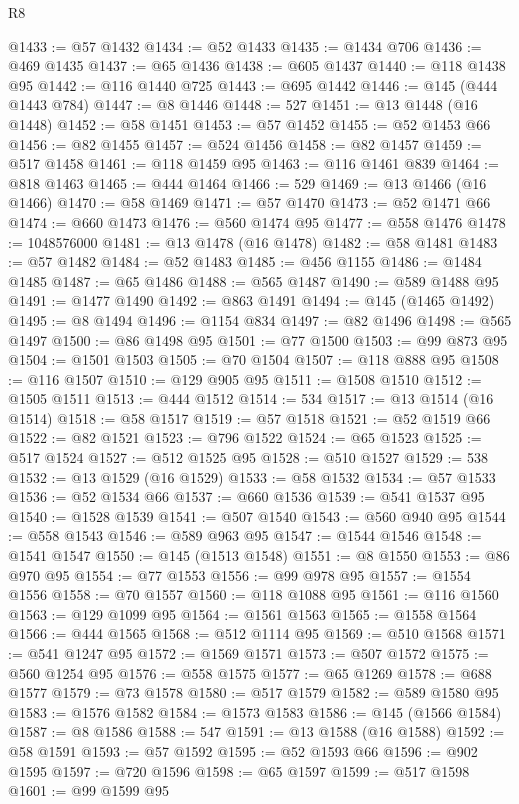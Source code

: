 \begin{lexlean}{R8}
\begin{coremodule}
@1433 := @57 @1432
@1434 := @52 @1433
@1435 := @1434 @706
@1436 := @469 @1435
@1437 := @65 @1436
@1438 := @605 @1437
@1440 := @118 @1438 @95
@1442 := @116 @1440 @725
@1443 := @695 @1442
@1446 := @145 (@444 @1443 @784)
@1447 := @8 @1446
@1448 := 527
@1451 := @13 @1448 (@16 @1448)
@1452 := @58 @1451
@1453 := @57 @1452
@1455 := @52 @1453 @66
@1456 := @82 @1455
@1457 := @524 @1456
@1458 := @82 @1457
@1459 := @517 @1458
@1461 := @118 @1459 @95
@1463 := @116 @1461 @839
@1464 := @818 @1463
@1465 := @444 @1464
@1466 := 529
@1469 := @13 @1466 (@16 @1466)
@1470 := @58 @1469
@1471 := @57 @1470
@1473 := @52 @1471 @66
@1474 := @660 @1473
@1476 := @560 @1474 @95
@1477 := @558 @1476
@1478 := 1048576000
@1481 := @13 @1478 (@16 @1478)
@1482 := @58 @1481
@1483 := @57 @1482
@1484 := @52 @1483
@1485 := @456 @1155
@1486 := @1484 @1485
@1487 := @65 @1486
@1488 := @565 @1487
@1490 := @589 @1488 @95
@1491 := @1477 @1490
@1492 := @863 @1491
@1494 := @145 (@1465 @1492)
@1495 := @8 @1494
@1496 := @1154 @834
@1497 := @82 @1496
@1498 := @565 @1497
@1500 := @86 @1498 @95
@1501 := @77 @1500
@1503 := @99 @873 @95
@1504 := @1501 @1503
@1505 := @70 @1504
@1507 := @118 @888 @95
@1508 := @116 @1507
@1510 := @129 @905 @95
@1511 := @1508 @1510
@1512 := @1505 @1511
@1513 := @444 @1512
@1514 := 534
@1517 := @13 @1514 (@16 @1514)
@1518 := @58 @1517
@1519 := @57 @1518
@1521 := @52 @1519 @66
@1522 := @82 @1521
@1523 := @796 @1522
@1524 := @65 @1523
@1525 := @517 @1524
@1527 := @512 @1525 @95
@1528 := @510 @1527
@1529 := 538
@1532 := @13 @1529 (@16 @1529)
@1533 := @58 @1532
@1534 := @57 @1533
@1536 := @52 @1534 @66
@1537 := @660 @1536
@1539 := @541 @1537 @95
@1540 := @1528 @1539
@1541 := @507 @1540
@1543 := @560 @940 @95
@1544 := @558 @1543
@1546 := @589 @963 @95
@1547 := @1544 @1546
@1548 := @1541 @1547
@1550 := @145 (@1513 @1548)
@1551 := @8 @1550
@1553 := @86 @970 @95
@1554 := @77 @1553
@1556 := @99 @978 @95
@1557 := @1554 @1556
@1558 := @70 @1557
@1560 := @118 @1088 @95
@1561 := @116 @1560
@1563 := @129 @1099 @95
@1564 := @1561 @1563
@1565 := @1558 @1564
@1566 := @444 @1565
@1568 := @512 @1114 @95
@1569 := @510 @1568
@1571 := @541 @1247 @95
@1572 := @1569 @1571
@1573 := @507 @1572
@1575 := @560 @1254 @95
@1576 := @558 @1575
@1577 := @65 @1269
@1578 := @688 @1577
@1579 := @73 @1578
@1580 := @517 @1579
@1582 := @589 @1580 @95
@1583 := @1576 @1582
@1584 := @1573 @1583
@1586 := @145 (@1566 @1584)
@1587 := @8 @1586
@1588 := 547
@1591 := @13 @1588 (@16 @1588)
@1592 := @58 @1591
@1593 := @57 @1592
@1595 := @52 @1593 @66
@1596 := @902 @1595
@1597 := @720 @1596
@1598 := @65 @1597
@1599 := @517 @1598
@1601 := @99 @1599 @95

\end{coremodule}
\end{lexlean}
